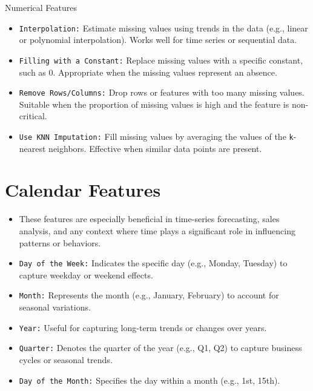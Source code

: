 \documentclass[serif, aspectratio=169]{beamer}
\begin{document}
\begin{frame}{Numerical Features}
    \begin{itemize}
         \item \texttt{\color{blue}Interpolation:} Estimate missing values using trends in the data (e.g., linear or polynomial interpolation). Works well for time series or sequential data.
        \item \texttt{\color{blue}Filling with a Constant:} Replace missing values with a specific constant, such as 0. Appropriate when the missing values represent an absence.
        \item \texttt{\color{blue}Remove Rows/Columns:} Drop rows or features with too many missing values. Suitable when the proportion of missing values is high and the feature is non-critical.
        \item \texttt{\color{blue}Use KNN Imputation:} Fill missing values by averaging the values of the \texttt{k}-nearest neighbors. Effective when similar data points are present.
    \end{itemize}
\end{frame}


\section{Calendar Features}

\begin{frame}
    \begin{itemize}
        \item These features are especially beneficial in time-series forecasting, sales analysis, and any context where time plays a significant role in influencing patterns or behaviors.
    \end{itemize}
    
\end{frame}

\begin{frame}
    \begin{itemize}
        \item \texttt{\color{purple}Day of the Week:} Indicates the specific day (e.g., Monday, Tuesday) to capture weekday or weekend effects.
        \item \texttt{\color{purple}Month:} Represents the month (e.g., January, February) to account for seasonal variations.
        \item \texttt{\color{purple}Year:} Useful for capturing long-term trends or changes over years.
        \item \texttt{\color{purple}Quarter:} Denotes the quarter of the year (e.g., Q1, Q2) to capture business cycles or seasonal trends.
        \item \texttt{\color{purple}Day of the Month:} Specifies the day within a month (e.g., 1st, 15th).   
    \end{itemize}
\end{frame}
\end{document}
